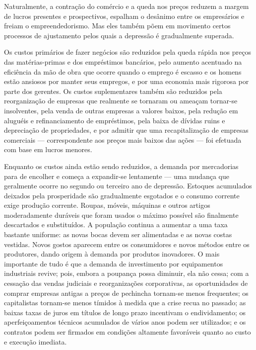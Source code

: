 \documentclass[12pt]{article}
\begin{document}
Naturalmente, a contração do comércio e a queda nos preços reduzem a margem de lucros presentes e prospectivos, espalham o desânimo entre os empresários e freiam o empreendedorismo. Mas eles também põem em movimento certos processos de ajustamento pelos quais a depressão é gradualmente superada.

Os custos primários de fazer negócios são reduzidos pela queda rápida nos preços das matérias-primas e dos empréstimos bancários, pelo aumento acentuado na eficiência da mão de obra que ocorre quando o emprego é escasso e os homens estão ansiosos por manter seus empregos, e por uma economia mais rigorosa por parte dos gerentes. Os custos suplementares também são reduzidos pela reorganização de empresas que realmente se tornaram ou ameaçam tornar-se insolventes, pela venda de outras empresas a valores baixos, pela redução em aluguéis e refinanciamento de empréstimos, pela baixa de dívidas ruins e depreciação de propriedades, e por admitir que uma recapitalização de empresas comerciais — correspondente aos preços mais baixos das ações — foi efetuada com base em lucros menores.

Enquanto os custos ainda estão sendo reduzidos, a demanda por mercadorias para de encolher e começa a expandir-se lentamente — uma mudança que geralmente ocorre no segundo ou terceiro ano de depressão. Estoques acumulados deixados pela prosperidade são gradualmente esgotados e o consumo corrente exige produção corrente. Roupas, móveis, máquinas e outros artigos moderadamente duráveis que foram usados o máximo possível são finalmente descartados e substituídos. A população continua a aumentar a uma taxa bastante uniforme: as novas bocas devem ser alimentadas e as novas costas vestidas. Novos gostos aparecem entre os consumidores e novos métodos entre os produtores, dando origem à demanda por produtos inovadores. O mais importante de tudo é que a demanda de investimento por equipamentos industriais revive; pois, embora a poupança possa diminuir, ela não cessa; com a cessação das vendas judiciais e reorganizações corporativas, as oportunidades de comprar empresas antigas a preços de pechincha tornam-se menos frequentes; os capitalistas tornam-se menos tímidos à medida que a crise recua no passado; as baixas taxas de juros em títulos de longo prazo incentivam o endividamento; os aperfeiçoamentos técnicos acumulados de vários anos podem ser utilizados; e os contratos podem ser firmados em condições altamente favoráveis quanto ao custo e execução imediata.
\end{document}
